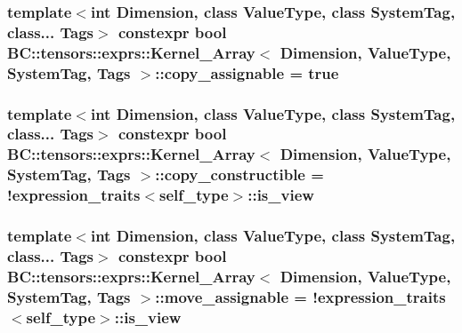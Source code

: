 \subsubsection[{\texorpdfstring{copy\+\_\+assignable}{copy_assignable}}]{\setlength{\rightskip}{0pt plus 5cm}template$<$int Dimension, class Value\+Type, class System\+Tag, class... Tags$>$ constexpr bool {\bf B\+C\+::tensors\+::exprs\+::\+Kernel\+\_\+\+Array}$<$ Dimension, Value\+Type, System\+Tag, Tags $>$\+::copy\+\_\+assignable = true\hspace{0.3cm}{\ttfamily [static]}}\hypertarget{structBC_1_1tensors_1_1exprs_1_1Kernel__Array_aba2bd2aa5dfc1bb60b6d08db2949bf7f}{}\label{structBC_1_1tensors_1_1exprs_1_1Kernel__Array_aba2bd2aa5dfc1bb60b6d08db2949bf7f}
\subsubsection[{\texorpdfstring{copy\+\_\+constructible}{copy_constructible}}]{\setlength{\rightskip}{0pt plus 5cm}template$<$int Dimension, class Value\+Type, class System\+Tag, class... Tags$>$ constexpr bool {\bf B\+C\+::tensors\+::exprs\+::\+Kernel\+\_\+\+Array}$<$ Dimension, Value\+Type, System\+Tag, Tags $>$\+::copy\+\_\+constructible = !{\bf expression\+\_\+traits}$<${\bf self\+\_\+type}$>$\+::is\+\_\+view\hspace{0.3cm}{\ttfamily [static]}}\hypertarget{structBC_1_1tensors_1_1exprs_1_1Kernel__Array_a8f9df18a7fb30244dbcaf5da4fe9cc0d}{}\label{structBC_1_1tensors_1_1exprs_1_1Kernel__Array_a8f9df18a7fb30244dbcaf5da4fe9cc0d}
\subsubsection[{\texorpdfstring{move\+\_\+assignable}{move_assignable}}]{\setlength{\rightskip}{0pt plus 5cm}template$<$int Dimension, class Value\+Type, class System\+Tag, class... Tags$>$ constexpr bool {\bf B\+C\+::tensors\+::exprs\+::\+Kernel\+\_\+\+Array}$<$ Dimension, Value\+Type, System\+Tag, Tags $>$\+::move\+\_\+assignable = !{\bf expression\+\_\+traits}$<${\bf self\+\_\+type}$>$\+::is\+\_\+view\hspace{0.3cm}{\ttfamily [static]}}\hypertarget{structBC_1_1tensors_1_1exprs_1_1Kernel__Array_aa2686081d657078b7750cf6836e128ca}{}\label{structBC_1_1tensors_1_1exprs_1_1Kernel__Array_aa2686081d657078b7750cf6836e128ca}
